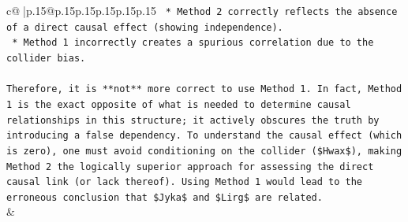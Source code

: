 \documentclass{article}
\begin{document}
{\begin{supertabular}{c@{$\;$}|p{.15\linewidth}@{}p{.15\linewidth}p{.15\linewidth}p{.15\linewidth}p{.15\linewidth}p{.15\linewidth}}
{{{\texttt{    *   Method 2 correctly reflects the absence of a direct causal effect (showing independence).} \\
\texttt{    *   Method 1 incorrectly creates a spurious correlation due to the collider bias.} \\
\\ 
\texttt{Therefore, it is **not** more correct to use Method 1. In fact, Method 1 is the exact opposite of what is needed to determine causal relationships in this structure; it actively obscures the truth by introducing a false dependency. To understand the causal effect (which is zero), one must avoid conditioning on the collider (\$Hwax\$), making Method 2 the logically superior approach for assessing the direct causal link (or lack thereof). Using Method 1 would lead to the erroneous conclusion that \$Jyka\$ and \$Lirg\$ are related.} \\
            }
        }
    }
    & \\ \\


\end{supertabular}}
\end{document}
